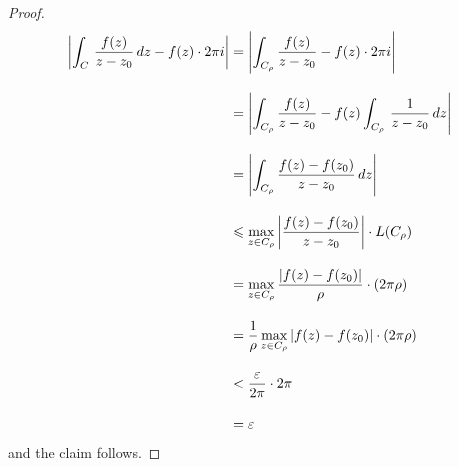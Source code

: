 \begin{proof}
\begin{align*}
\left\lvert\int_C\,\frac{f(z)}{z - z_0}\,dz - f(z)\cdot 2\pi i\right\rvert &= \left\lvert\int_{C_\rho}\frac{f(z)}{z - z_0} - f(z)\cdot 2\pi i\right\rvert\\[1em]
 &= \left\lvert\int_{C_{\rho}}\frac{f(z)}{z - z_0} - f(z)\int_{C_{\rho}}\,\frac{1}{z - z_0}\,dz\right\rvert\\[1em]
 &= \left\lvert\int_{C_{\rho}}\frac{f(z) - f(z_0)}{z - z_0}\,dz\right\rvert\\[1em]
 &\leqslant \max_{z \in C_{\rho}}\left\lvert\frac{f(z) - f(z_0)}{z - z_0}\right\rvert\cdot L(C_{\rho})\\[1em]
 &= \max_{z \in C_{\rho}}\frac{\left\lvert f(z) - f(z_0)\right\rvert}{\rho}\cdot (2\pi\rho)\\[1em]
 &= \frac{1}{\rho}\max_{z \in C_{\rho}}\left\lvert f(z) - f(z_0)\right\rvert\cdot (2\pi\rho)\\[1em]
 &< \frac{\varepsilon}{2\pi}\cdot 2\pi\\[1em]
 &= \varepsilon
\end{align*}
and the claim follows.
\end{proof}

\medskip

